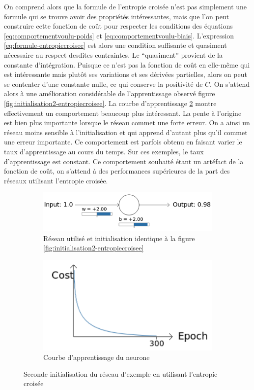 On comprend alors que la formule de l'entropie croisée n'est pas simplement une formule qui se trouve avoir des propriétés intéressantes, mais que l'on peut construire cette fonction de coût pour respecter les conditions des équations \ref{eq:comportementvoulu-poids} et \ref{eq:comportementvoulu-biais}.
L'expression \ref{eq:formule-entropiecroisee} est alors une condition suffisante et quasiment nécessaire au respect desdites contraintes.
Le ``quasiment'' provient de la constante d'intégration. Puisque ce n'est pas la fonction de coût en elle-même qui est intéressante mais plutôt ses variations et ses dérivées partielles, alors on peut se contenter d'une constante nulle, ce qui conserve la positivité de $C$. On s'attend alors à une amélioration considérable de l'apprentissage observé figure \ref{fig:initialisation2-entropiecroisee}. La courbe d'apprentissage \ref{fig:initialisation3-entropiecroisee-courbe} montre effectivement un comportement beaucoup plus intéressant. La pente à l'origine est bien plus importante lorsque le réseau commet une forte erreur. On a ainsi un réseau moins sensible à l'initialisation et qui apprend d'autant plus qu'il commet une erreur importante. Ce comportement est parfois obtenu en faisant varier le taux d'apprentissage au cours du temps. Sur ces exemples, le taux d'apprentissage est constant. Ce comportement souhaité étant un artéfact de la fonction de coût, on s'attend à des performances supérieures de la part des réseaux utilisant l'entropie croisée.

\begin{figure}[h]
\centering
\begin{subfigure}{.5\textwidth}
  \centering
  \includegraphics[width=.6\linewidth]{img/entropiecroisee_reseau_utilise_init2.png}
  \caption{Réseau utilisé et initialisation identique à la figure \ref{fig:initialisation2-entropiecroisee}}
  \label{fig:initialisation3-entropiecroisee-schema}
\end{subfigure}%
\begin{subfigure}{.4\textwidth}
  \centering
  \includegraphics[width=.4\linewidth]{img/entropiecroisee_apprentissage3.png}
  \caption{Courbe d'apprentissage du neurone}
  \label{fig:initialisation3-entropiecroisee-courbe}
\end{subfigure}
\caption{Seconde initialisation du réseau d'exemple en utilisant l'entropie croisée}
\label{fig:initialisation3-entropiecroisee}
\end{figure}

